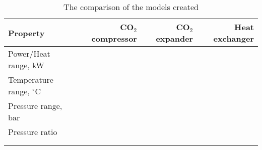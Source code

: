 \begin{table}
\label{tab:DiscussionComparison}
\caption{The comparison of the models created}
\begin{center}
\begin{tabulary}{0.9\textwidth}{LRRR}
\toprule
Property    	                &	CO$_2$ compressor & CO$_2$	expander & Heat exchanger \\
\midrule
Power/Heat range, kW            & & & \\
Temperature range, $^\circ$C    & & & \\
Pressure range, bar             & & & \\
Pressure ratio& & & \\
& & & \\
& & & \\
\bottomrule
\end{tabulary}
\end{center}
\end{table}
